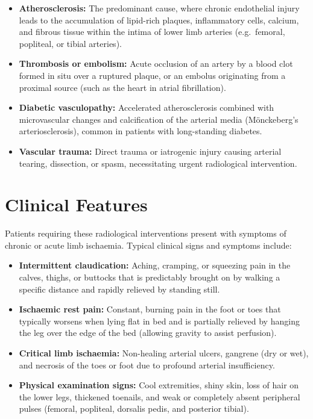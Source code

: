 \begin{itemize}
    \item \textbf{Atherosclerosis:} The predominant cause, where chronic endothelial injury leads to the accumulation of lipid-rich plaques, inflammatory cells, calcium, and fibrous tissue within the intima of lower limb arteries (e.g.\ femoral, popliteal, or tibial arteries).
    \item \textbf{Thrombosis or embolism:} Acute occlusion of an artery by a blood clot formed in situ over a ruptured plaque, or an embolus originating from a proximal source (such as the heart in atrial fibrillation).
    \item \textbf{Diabetic vasculopathy:} Accelerated atherosclerosis combined with microvascular changes and calcification of the arterial media (Mönckeberg's arteriosclerosis), common in patients with long-standing diabetes.
    \item \textbf{Vascular trauma:} Direct trauma or iatrogenic injury causing arterial tearing, dissection, or spasm, necessitating urgent radiological intervention.
\end{itemize}

\section*{Clinical Features}
Patients requiring these radiological interventions present with symptoms of chronic or acute limb ischaemia. Typical clinical signs and symptoms include:

\begin{itemize}
    \item \textbf{Intermittent claudication:} Aching, cramping, or squeezing pain in the calves, thighs, or buttocks that is predictably brought on by walking a specific distance and rapidly relieved by standing still.
    \item \textbf{Ischaemic rest pain:} Constant, burning pain in the foot or toes that typically worsens when lying flat in bed and is partially relieved by hanging the leg over the edge of the bed (allowing gravity to assist perfusion).
    \item \textbf{Critical limb ischaemia:} Non-healing arterial ulcers, gangrene (dry or wet), and necrosis of the toes or foot due to profound arterial insufficiency.
    \item \textbf{Physical examination signs:} Cool extremities, shiny skin, loss of hair on the lower legs, thickened toenails, and weak or completely absent peripheral pulses (femoral, popliteal, dorsalis pedis, and posterior tibial).
\end{itemize}

